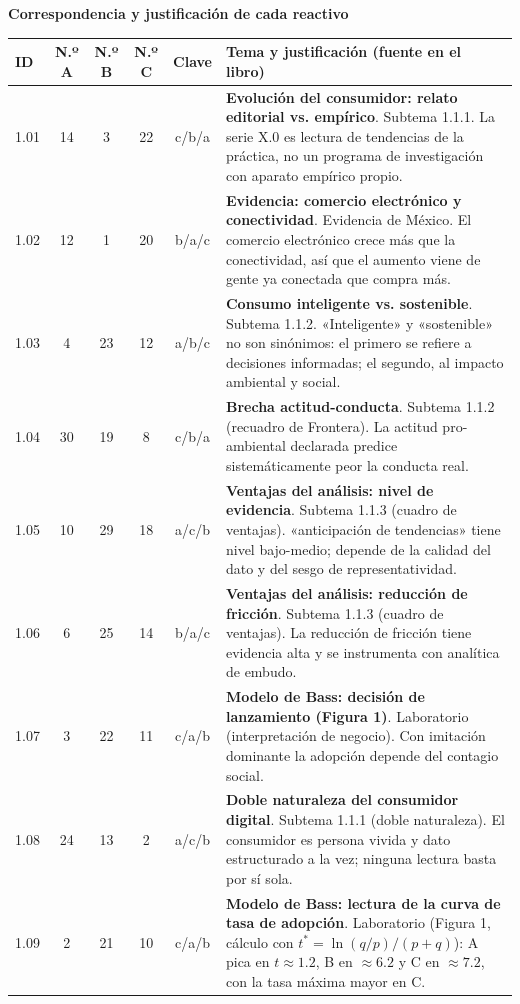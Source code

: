 \documentclass[10pt,letterpaper]{article}
\begin{document}
\vspace{2pt}
\textbf{Correspondencia y justificación de cada reactivo}\\[2pt]
{\scriptsize\renewcommand{\arraystretch}{1.08}\setlength{\tabcolsep}{3pt}
\begin{tabularx}{\textwidth}{@{}l c c c c X@{}}\toprule
\textbf{ID} & \textbf{N.º A} & \textbf{N.º B} & \textbf{N.º C} & \textbf{Clave} & \textbf{Tema y justificación (fuente en el libro)}\\\midrule
1.01 & 14 & 3 & 22 & c/b/a & \textbf{Evolución del consumidor: relato editorial vs. empírico}. Subtema 1.1.1. La serie X.0 es lectura de tendencias de la práctica, no un programa de investigación con aparato empírico propio.\\
1.02 & 12 & 1 & 20 & b/a/c & \textbf{Evidencia: comercio electrónico y conectividad}. Evidencia de México. El comercio electrónico crece más que la conectividad, así que el aumento viene de gente ya conectada que compra más.\\
1.03 & 4 & 23 & 12 & a/b/c & \textbf{Consumo inteligente vs. sostenible}. Subtema 1.1.2. «Inteligente» y «sostenible» no son sinónimos: el primero se refiere a decisiones informadas; el segundo, al impacto ambiental y social.\\
1.04 & 30 & 19 & 8 & c/b/a & \textbf{Brecha actitud-conducta}. Subtema 1.1.2 (recuadro de Frontera). La actitud pro-ambiental declarada predice sistemáticamente peor la conducta real.\\
1.05 & 10 & 29 & 18 & a/c/b & \textbf{Ventajas del análisis: nivel de evidencia}. Subtema 1.1.3 (cuadro de ventajas). «anticipación de tendencias» tiene nivel bajo-medio; depende de la calidad del dato y del sesgo de representatividad.\\
1.06 & 6 & 25 & 14 & b/a/c & \textbf{Ventajas del análisis: reducción de fricción}. Subtema 1.1.3 (cuadro de ventajas). La reducción de fricción tiene evidencia alta y se instrumenta con analítica de embudo.\\
1.07 & 3 & 22 & 11 & c/a/b & \textbf{Modelo de Bass: decisión de lanzamiento (Figura 1)}. Laboratorio (interpretación de negocio). Con imitación dominante la adopción depende del contagio social.\\
1.08 & 24 & 13 & 2 & a/c/b & \textbf{Doble naturaleza del consumidor digital}. Subtema 1.1.1 (doble naturaleza). El consumidor es persona vivida y dato estructurado a la vez; ninguna lectura basta por sí sola.\\
1.09 & 2 & 21 & 10 & c/a/b & \textbf{Modelo de Bass: lectura de la curva de tasa de adopción}. Laboratorio (Figura 1, cálculo con $t^\ast=\ln(q/p)/(p+q)$): A pica en $t\approx1.2$, B en $\approx6.2$ y C en $\approx7.2$, con la tasa máxima mayor en C.\\

\end{tabularx}}
\end{document}
